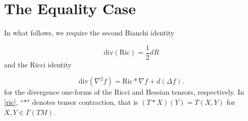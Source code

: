 \documentclass[12pt]{amsart}
\theoremstyle{definition}
\numberwithin{equation}{section}
\begin{document}
\section{The Equality Case}
In what follows, we require the second Bianchi identity

\begin{equation} \label{bianchi}
    \text{div} \left( \text{Ric} \right) = \frac{1}{2} d R
\end{equation}
and the Ricci identity

\begin{equation} \label{ric}
    \text{div} \left( \nabla^{2} f \right) = \text{Ric} * \nabla f + d (\Delta f).
\end{equation}
for the divergence one-forms of the Ricci and Hessian tensors, respectively. In \eqref{ric}, ``$*$" denotes tensor contraction, that is $(T*X) (Y) = T(X, Y)$ for $X, Y \in \Gamma(TM)$.
\end{document}
